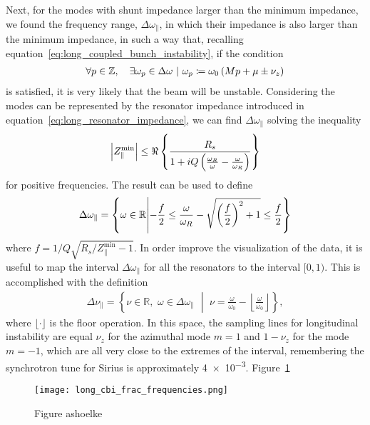     Next, for the modes with shunt impedance larger than the minimum impedance, we found the frequency range, $\Delta\omega_\parallel$, in which their impedance is also larger than the minimum impedance, in such a way that, recalling equation~\eqref{eq:long_coupled_bunch_instability}, if the condition
    \begin{align}
        \left.\forall p \in \mathbb{Z},\quad \exists \omega_p \in \Delta \omega \,\, \middle| \,\, \omega_p \coloneqq \omega_0\left(Mp + \mu \pm \nu_z\right)\right.
    \end{align}
    is satisfied, it is very likely that the beam will be unstable. Considering the modes can be represented by the resonator impedance introduced in equation~\eqref{eq:long_resonator_impedance}, we can find $\Delta\omega_\parallel$ solving the inequality
    \begin{align}
        \left|Z_\parallel^\text{min}\right| \le \Re\left\{\frac{R_s}{1 + iQ\left(\frac{\omega_R}{\omega}-\frac{\omega}{\omega_R}\right)}\right\}
    \end{align}
    for positive frequencies. The result can be used to define
    \begin{align}
        \Delta\omega_\parallel = \left\{\omega \in \mathbb{R} \middle| -\frac{f}{2} \le \frac{\omega}{\omega_R} - \sqrt{\left(\frac{f}{2}\right)^2+1} \le
        \frac{f}{2} \right\}
    \end{align}
    where $f = 1/Q\sqrt{R_s/Z_\parallel^\text{min}-1}$. In order improve the visualization of the data, it is useful to map the interval $\Delta\omega_\parallel$ for all the resonators to the interval $[0,1)$. This is accomplished with the definition
    \begin{align}\label{eq:cbi_frac_frequencies}
        \Delta\nu_\parallel = \left\{\nu \in \mathbb{R},\,\,\omega \in \Delta\omega_\parallel\,\, \middle|\,\,
        \nu=\frac{\omega}{\omega_0} - \left\lfloor\frac{\omega}{\omega_0}\right\rfloor \right\},
    \end{align}
    where $\lfloor\cdot\rfloor$ is the floor operation. In this space, the sampling lines for longitudinal instability are equal $\nu_z$ for the azimuthal mode $m=1$ and $1 - \nu_z$ for the mode $m=-1$, which are all very close to the extremes of the interval, remembering the synchrotron tune for Sirius is approximately \SI{4e-3}{}.
    Figure~\ref{fig:long_cbi_frac_frequencies}
    \begin{figure}
        \centering
        \texttt{[image: long\_cbi\_frac\_frequencies.png]}
        \caption{Figure ashoelke}
        \label{fig:long_cbi_frac_frequencies}
    \end{figure}
